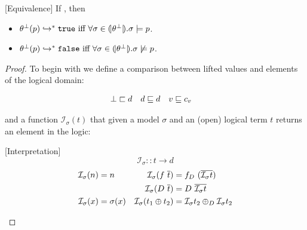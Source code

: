 \begin{theorem}{[Equivalence]}\label{thm:equiv}
If , then
\begin{itemize}
\item $\evals{\botsto(p)}{\etrue}\ \mbox{iff}\ 
	\forall \sigma \in \embed{\botsto}. \lmodels{\sigma}{p}$.
\item $\evals{\botsto(p)}{\efalse}\ 
	\mbox{iff}\ 
	\forall \sigma \in \embed{\botsto}. \lmodels{\sigma\not}{p}$.
\end{itemize}
\end{theorem}
\begin{proof}
\newcommand\sigmamodel{\ensuremath{\sigma}}
\newcommand\interpI{\ensuremath{\mathcal{I}}}
\newcommand\interpIEq[3]{\ensuremath{\interpI_{\sigmamodel}(#2) = #3}}
\newcommand\interpIGEq[3]{\ensuremath{\interpI_{\sigmamodel}(#2) \sqsupseteq #3}}
\newcommand\interpINGEq[3]{\ensuremath{\interpI_{\sigmamodel}(#2) \not\sqsupseteq #3}}
\newcommand\interpINEq[3]{\ensuremath{\interpI_{\sigmamodel}(#2) \not = #3}}
\newcommand\interpIENGEq[4]{\ensuremath{\interpI_{\sigmamodel}(#2) = {#3}\not \sqsupseteq #4}}

To begin with we define a comparison between lifted values and 
elements of the logical domain:
\begin{definition}
\begin{align*}
\perp &\sqsubset d & d &\sqsubseteq d & v &\sqsubseteq c_v
\end{align*}
\end{definition}

and a function $\interpI_\sigmamodel (t)$
that given a model $\sigmamodel$ and an (open) logical term $t$ returns an element in the logic:

\begin{definition}{[Interpretation]}
$$\interpI_{\sigmamodel} :: t \rightarrow d $$
%
\begin{align*}
\interpIEq{\sigmamodel}{n&}{n} & 
\interpIEq{\sigmamodel}{f\ \overline{t}&}{f_D\ (\overline{\interpI_{\sigmamodel}{t}})}\\
& & \interpIEq{\sigmamodel}{D\ \overline{t}&}{D\ \overline{\interpI_{\sigmamodel}{t}}}\\
\interpIEq{\sigmamodel}{x&}{\sigmamodel(x)}& \interpIEq{\sigmamodel}{t_1 \oplus t_2 &}{\interpI_{\sigmamodel}{t_2}\oplus_D \interpI_{\sigmamodel}{t_2}}\\
\end{align*}
\end{definition}


\end{proof}
